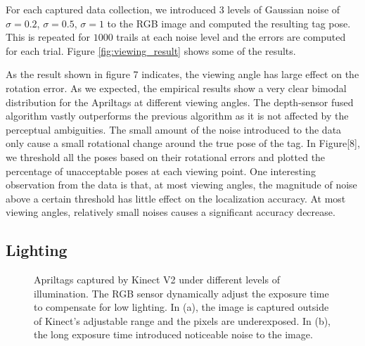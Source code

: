For each captured data collection, we introduced 3 levels of Gaussian noise of $\sigma = 0.2$, $\sigma = 0.5$, $\sigma = 1$  to the RGB image and computed the resulting tag pose. This is repeated for $1000$ trails at each noise level and the errors are computed for each trial. Figure \ref{fig:viewing_result} shows some of the results. 

As the result shown in figure 7 indicates, the viewing angle has large effect on the rotation error. As we expected, the empirical results show a very clear bimodal distribution for the Apriltags at different viewing angles. The depth-sensor fused algorithm vastly outperforms the previous algorithm as it is not affected by the perceptual ambiguities. The small amount of the noise introduced to the data only cause a small rotational change around the true pose of the tag. In Figure[8], we threshold all the poses based on their rotational errors and plotted the percentage of unacceptable poses at each viewing point. One interesting observation from the data is that, at most viewing angles, the magnitude of noise above a certain threshold has little effect on the localization accuracy. At most viewing angles, relatively small noises causes a significant accuracy decrease. 

\subsection{Lighting}
\begin{figure}
\centering
{}
\label{fig:illumination_tag}
\caption{Apriltags captured by Kinect V2 under different levels of illumination. The RGB sensor dynamically adjust the exposure time to compensate for low lighting. In (a), the image is captured outside of Kinect's adjustable range and the pixels are underexposed. In (b), the long exposure time introduced noticeable noise to the image. }
\end{figure}


